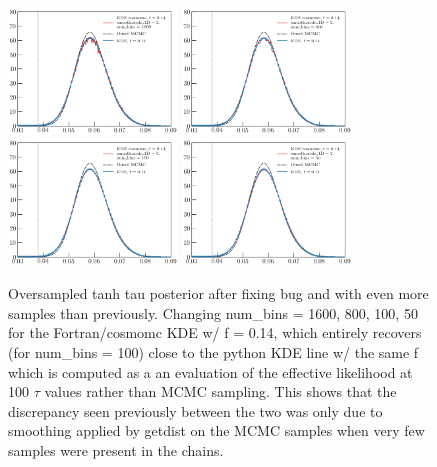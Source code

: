 \documentclass[prd,amsmath,amssymb,floatfix,superscriptaddress,nofootinbib]{revtex4-1}
\begin{document}
\begin{figure}
\includegraphics[width=0.4\textwidth]{cosmomc_kde/pl18_relike_tanh_tau_dz0p5_oversampled_1D_smooth_scale_1D_2_num_bins_1D_1600_post_bug_fix.png}
\includegraphics[width=0.4\textwidth]{cosmomc_kde/pl18_relike_tanh_tau_dz0p5_oversampled_1D_smooth_scale_1D_2_num_bins_1D_800_post_bug_fix.png}
\includegraphics[width=0.4\textwidth]{cosmomc_kde/pl18_relike_tanh_tau_dz0p5_oversampled_1D_smooth_scale_1D_2_num_bins_1D_100_post_bug_fix.png}
\includegraphics[width=0.4\textwidth]{cosmomc_kde/pl18_relike_tanh_tau_dz0p5_oversampled_1D_smooth_scale_1D_2_num_bins_1D_50_post_bug_fix.png}
\label{fig:}
\caption{Oversampled tanh tau posterior after fixing bug and with even more samples than previously. Changing num\_bins = 1600, 800, 100, 50 for the Fortran/cosmomc KDE w/ f = 0.14, which entirely recovers (for num\_bins = 100) close to the python KDE line w/ the same f which is computed as a an evaluation of the effective likelihood at 100 $\tau$ values rather than MCMC sampling. This shows that the discrepancy seen previously between the two was only due to smoothing applied by getdist on the MCMC samples when very few samples were present in the chains.
} 
\end{figure}
\end{document}
